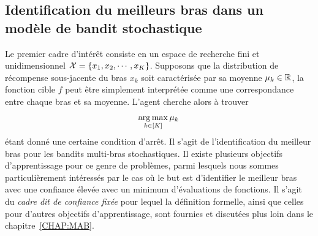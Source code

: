 
\subsection{Identification du meilleurs bras dans un modèle de bandit stochastique}\label{sec:abs.mab.bai}

Le premier cadre d'intérêt consiste en un espace de recherche fini et unidimensionnel $\mathcal{X} = \{x_1,x_2,\cdots,x_K\}$. Supposons que la distribution de récompense sous-jacente du bras $x_k$ soit caractérisée par sa moyenne $\mu_k\in\mathbb{R}$, la fonction cible $f$ peut être simplement interprétée comme une correspondance entre chaque bras et sa moyenne. L'agent cherche alors à trouver
\begin{align}\label{eq:abs.optim_bai}
    \operatorname*{arg\,max}_{k\in[K]} \mu_k\,
\end{align}
étant donné une certaine condition d'arrêt. Il s'agit de l'identification du meilleur bras pour les bandits multi-bras stochastiques. Il existe plusieurs objectifs d'apprentissage pour ce genre de problèmes, parmi lesquels nous sommes particulièrement intéressés par le cas où le but est d'identifier le meilleur bras avec une confiance élevée avec un minimum d'évaluations de fonctions. Il s'agit du \emph{cadre dit de confiance fixée} pour lequel la définition formelle, ainsi que celles pour d'autres objectifs d'apprentissage, sont fournies et discutées plus loin dans le chapitre~\ref{CHAP:MAB}.

